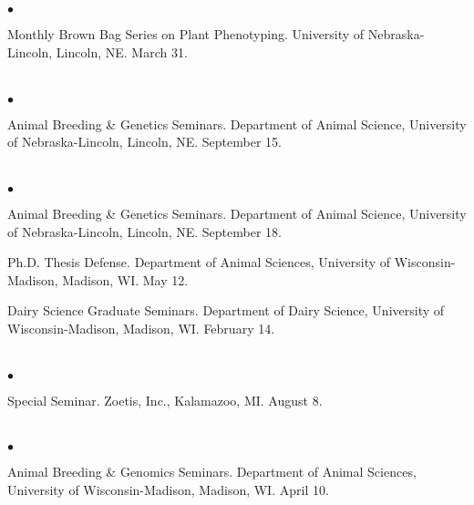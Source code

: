 \documentclass[margin,line,10pt]{res}
\newenvironment{list2}{
  \begin{list}{$\bullet$}{%
      \setlength{\itemsep}{0in}
      \setlength{\parsep}{0in} \setlength{\parskip}{0in}
      \setlength{\topsep}{0in} \setlength{\partopsep}{0in} 
      \setlength{\leftmargin}{0.2in}}}{\end{list}}
\begin{document}
\begin{resume}
\section{}
\begin{list2}
\item Monthly Brown Bag Series on Plant Phenotyping. University of Nebraska-Lincoln, Lincoln, NE. March 31. 
\end{list2}  

\section{}
\begin{list2}
\item  Animal Breeding \& Genetics Seminars. Department of Animal Science, University of Nebraska-Lincoln, Lincoln, NE. September 15. 
\end{list2}  

\section{}
\begin{list2}
\item  Animal Breeding \& Genetics Seminars. Department of Animal Science, University of Nebraska-Lincoln, Lincoln, NE. September 18. 
\vspace{0.5cm}
\item  Ph.D. Thesis Defense. Department of Animal Sciences, University of Wisconsin-Madison, Madison, WI. May 12. 
\vspace{0.5cm}
\item  Dairy Science Graduate Seminars. Department of Dairy Science, University of Wisconsin-Madison, Madison, WI. February 14. 
\end{list2}  

\section{}
\begin{list2}
\item  Special Seminar.  Zoetis, Inc., Kalamazoo, MI. August 8. 
\end{list2}  

\section{}
\begin{list2}
 \item Animal Breeding \& Genomics Seminars.  Department of Animal Sciences, University of Wisconsin-Madison, Madison, WI. April 10.
\end{list2}  


\end{resume}
\end{document}
